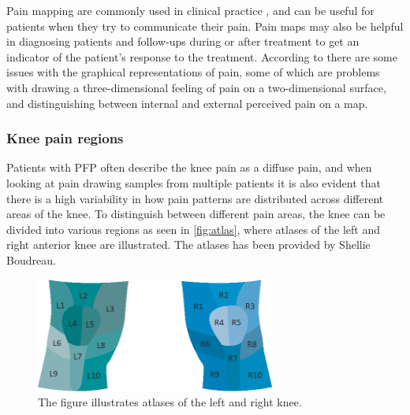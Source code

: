 Pain mapping are commonly used in clinical practice \citep{Schott2010}, and can be useful for patients when they try to communicate their pain. Pain maps may also be helpful in diagnosing patients and follow-ups during or after treatment to get an indicator of the patient’s response to the treatment.\citep{Boudreau2016}
According to \citeauthor{Schott2010} there are some issues with the graphical representations of pain, some of which are problems with drawing a three-dimensional feeling of pain on a two-dimensional surface, and distinguishing between internal and external perceived pain on a map.\citep{Schott2010}

\subsubsection{Knee pain regions}
Patients with PFP often describe the knee pain as a diffuse pain, and when looking at pain drawing samples from multiple patients it is also evident that there is a high variability in how pain patterns are distributed across different areas of the knee. 
To distinguish between different pain areas, the knee can be divided into various regions as seen in \autoref{fig:atlas}, where atlases of the left and right anterior knee are illustrated. The atlases has been provided by Shellie Boudreau. 

\begin{figure} [H]
\centering
\includegraphics[width=0.7\textwidth]{figures/atlas}
\caption{The figure illustrates atlases of the left and right knee.}
\label{fig:atlas}
\end{figure}

